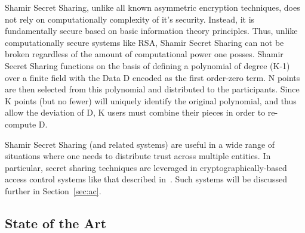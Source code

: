 \documentclass{sig-alternate}
\begin{document}
Shamir Secret Sharing, unlike all known asymmetric encryption
techniques, does not rely on computationally complexity of it's
security. Instead, it is fundamentally secure based on basic
information theory principles. Thus, unlike computationally secure
systems like RSA, Shamir Secret Sharing can not be broken regardless
of the amount of computational power one posses. Shamir Secret Sharing
functions on the basis of defining a polynomial of degree (K-1) over a
finite field with the Data D encoded as the first order-zero term. N
points are then selected from this polynomial and distributed to the
participants. Since K points (but no fewer) will uniquely identify the
original polynomial, and thus allow the deviation of D, K users must
combine their pieces in order to re-compute D.

Shamir Secret Sharing (and related systems) are useful in a wide range
of situations where one needs to distribute trust across multiple
entities. In particular, secret sharing techniques are leveraged in
cryptographically-based access control systems like that described
in~\cite{Goyal2006}. Such systems will be discussed further in
Section~\ref{sec:ac}.

\subsection{State of the Art}


\end{document}
